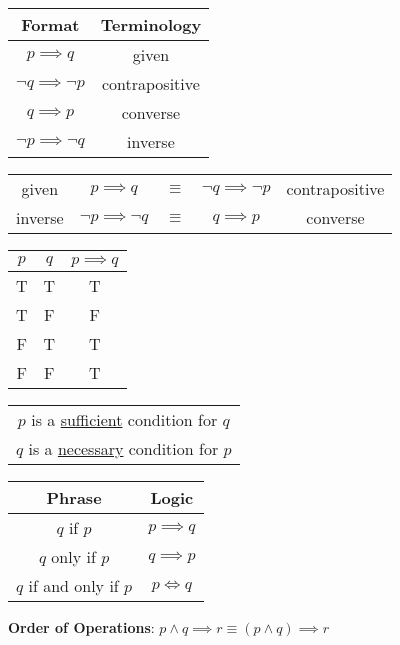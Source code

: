 \begin{center}
  \begin{tabular}{c|c}
    Format                     & Terminology    \\
    \hline
    $p \implies q$             & given          \\
    $\lnot q \implies \lnot p$ & contrapositive \\
    $q \implies p$             & converse       \\
    $\lnot p \implies \lnot q$ & inverse        \\
  \end{tabular}
  \qquad
  \begin{tabular}{ccccc}
    given   & $p \implies q$             & $\equiv$ & $\lnot q \implies \lnot p$ & contrapositive \\
    inverse & $\lnot p \implies \lnot q$ & $\equiv$ & $q \implies p$             & converse
  \end{tabular}
\end{center}

\begin{center}
  \begin{tabular}{c|c|c}
    $p$ & $q$ & $p \implies q$ \\
    \hline
    T   & T   & T              \\
    T   & F   & F              \\
    F   & T   & T              \\
    F   & F   & T              \\
  \end{tabular}
  \quad
  \begin{tabular}{c}
    $p$ is a \underline{sufficient} condition for $q$ \\
    $q$ is a \underline{necessary} condition for $p$
  \end{tabular}
  \quad
  \begin{tabular}{c|c}
    Phrase                 & Logic          \\
    \hline
    $q$ if $p$             & $p \implies q$ \\
    $q$ only if $p$        & $q \implies p$ \\
    $q$ if and only if $p$ & $p \iff q$
  \end{tabular}
\end{center}

\begin{center}
  \textbf{Order of Operations}: $p \land q \implies r \equiv (p \land q) \implies r$
\end{center}

